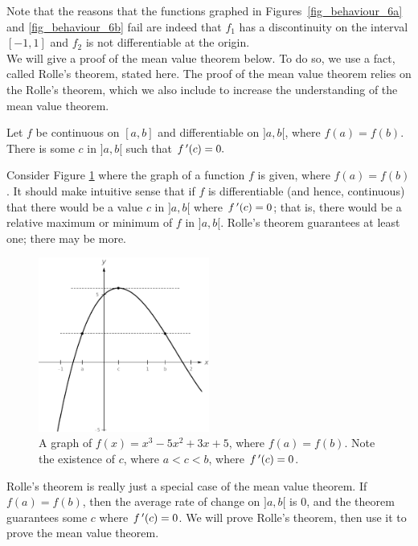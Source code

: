 Note that the reasons that the functions graphed in Figures~\ref{fig_behaviour_6a} and \ref{fig_behaviour_6b} fail are indeed that $f_1$ has a discontinuity on the interval $[-1,1]$ and $f_2$ is not differentiable at the origin.\\

\ifanalysis We will give a proof of the mean value theorem below. To do so, we use a fact, called Rolle's theorem, stated here.\fi
\ifcalculus The proof of the mean value theorem relies on the Rolle's theorem, which we also include to increase the understanding of the mean value theorem. \fi

\begin{theorem}\label{thm:rolles}
Let $f$ be continuous on $[a,b]$ and differentiable on $]a,b[$, where $f(a) = f(b)$. There is some $c$ in $]a,b[$ such that $f\,'(c) = 0.$
\end{theorem}

Consider Figure \ref{fig_behaviour_7} where the graph of a function $f$ is given, where $f(a) = f(b)$. It should make intuitive sense that if $f$ is differentiable (and hence, continuous) that there would be a value $c$ in $]a,b[$ where $f\,'(c)=0$; that is, there would be a relative maximum or minimum of $f$ in $]a,b[$. Rolle's theorem guarantees at least one; there may be more. 

\begin{figure}[h]
	\begin{center}
			\includegraphics[width=0.5\textwidth]{fig_behaviour_7}
	\caption{A graph of $f(x) = x^3-5x^2+3x+5$, where $f(a) = f(b)$. Note the existence of $c$, where $a<c<b$, where $f\,'(c)=0$.}
	\label{fig_behaviour_7}
	\end{center}
\end{figure}


Rolle's theorem is really just a special case of the mean value theorem. If $f(a) = f(b)$, then the average rate of change on $]a,b[$ is $0$, and the theorem guarantees some $c$ where $f\,'(c)=0$. \ifanalysis We will prove Rolle's theorem, then use it to prove the mean value theorem.


